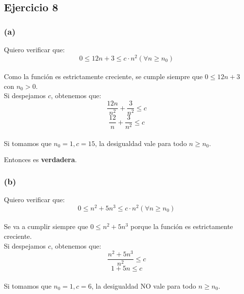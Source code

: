 \documentclass[12 pt]{article}
\begin{document}
    \subsection*{Ejercicio 8}
        \subsubsection*{(a)}
            Quiero verificar que:
            \[0 \leq 12n+3 \leq c \cdot n^{2} (\forall n \geq n_{0})\]
            \\
            Como la función es estrictamente creciente, se cumple siempre que \(0 \leq 12n+3\) con \(n_{0} > 0\).
            \\
            Si despejamos $c$, obtenemos que:
            \[\frac{12n}{n^{2}}+\frac{3}{n^{2}} \leq c\]
            \[\frac{12}{n}+\frac{3}{n^{2}} \leq c\]
            \\
            Si tomamos que $n_{0} = 1, c = 15$, la desigualdad vale para todo $n \geq n_{0}$.

            \begin{center}
            \end{center}

            Entonces es \textbf{verdadera}.
        
        \subsubsection*{(b)}
            Quiero verificar que:
            \[0 \leq n^{2}+5n^{3} \leq c \cdot n^{2} (\forall n \geq n_{0})\]
            \\
            Se va a cumplir siempre que \(0 \leq n^{2}+5n^{3}\) porque la función es estrictamente creciente.
            \\
            Si despejamos $c$, obtenemos que:
            \[\frac{n^{2}+5n^{3}}{n^{2}} \leq c\]
            \[1 + 5n \leq c\]
            \\
            Si tomamos que \(n_{0} = 1, c = 6\), la desigualdad NO vale para todo \(n \geq n_{0}\).
\end{document}

